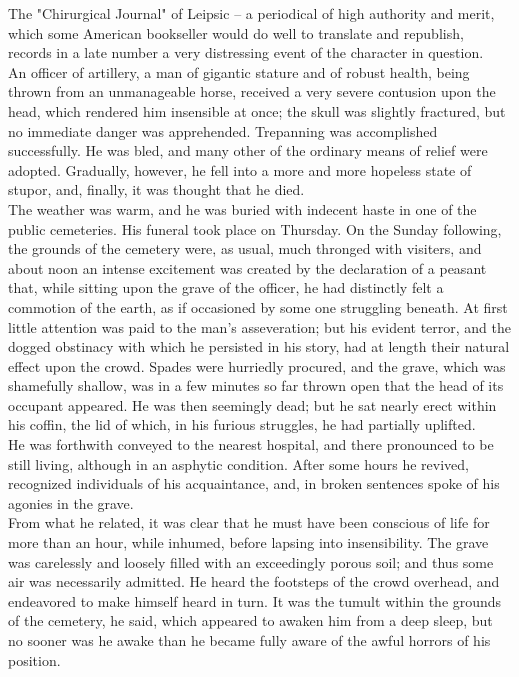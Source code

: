 \documentclass[12pt,a4paper]{article}
\begin{document}
The "Chirurgical Journal" of Leipsic -- a periodical of high authority and merit, which some American bookseller would do well to translate and republish, records in a late number a very distressing event of the character in question. \\

An officer of artillery, a man of gigantic stature and of robust health, being thrown from an unmanageable horse, received a very severe contusion upon the head, which rendered him insensible at once; the skull was slightly fractured, but no immediate danger was apprehended. Trepanning was accomplished successfully. He was bled, and many other of the ordinary means of relief were adopted. Gradually, however, he fell into a more and more hopeless state of stupor, and, finally, it was thought that he died. \\

The weather was warm, and he was buried with indecent haste in one of the public cemeteries. His funeral took place on Thursday. On the Sunday following, the grounds of the cemetery were, as usual, much thronged with visiters, and about noon an intense excitement was created by the declaration of a peasant that, while sitting upon the grave of the officer, he had distinctly felt a commotion of the earth, as if occasioned by some one struggling beneath. At first little attention was paid to the man's asseveration; but his evident terror, and the dogged obstinacy with which he persisted in his story, had at length their natural effect upon the crowd. Spades were hurriedly procured, and the grave, which was shamefully shallow, was in a few minutes so far thrown open that the head of its occupant appeared. He was then seemingly dead; but he sat nearly erect within his coffin, the lid of which, in his furious struggles, he had partially uplifted. \\

He was forthwith conveyed to the nearest hospital, and there pronounced to be still living, although in an asphytic condition. After some hours he revived, recognized individuals of his acquaintance, and, in broken sentences spoke of his agonies in the grave. \\

From what he related, it was clear that he must have been conscious of life for more than an hour, while inhumed, before lapsing into insensibility. The grave was carelessly and loosely filled with an exceedingly porous soil; and thus some air was necessarily admitted. He heard the footsteps of the crowd overhead, and endeavored to make himself heard in turn. It was the tumult within the grounds of the cemetery, he said, which appeared to awaken him from a deep sleep, but no sooner was he awake than he became fully aware of the awful horrors of his position. \\
\end{document}
